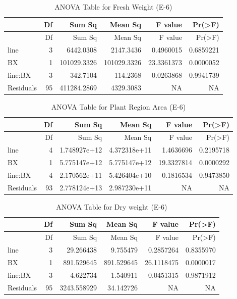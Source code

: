 \documentclass[
  10pt,
]{article}
\begin{document}
\begin{longtable}[]{@{}lrrrrr@{}}
\caption{ANOVA Table for Fresh Weight (E-6)}\tabularnewline
\toprule\noalign{}
& Df & Sum Sq & Mean Sq & F value & Pr(\textgreater F) \\
\midrule\noalign{}
\endfirsthead
\toprule\noalign{}
& Df & Sum Sq & Mean Sq & F value & Pr(\textgreater F) \\
\midrule\noalign{}
\endhead
\bottomrule\noalign{}
\endlastfoot
line & 3 & 6442.0308 & 2147.3436 & 0.4960015 & 0.6859221 \\
BX & 1 & 101029.3326 & 101029.3326 & 23.3361373 & 0.0000052 \\
line:BX & 3 & 342.7104 & 114.2368 & 0.0263868 & 0.9941739 \\
Residuals & 95 & 411284.2869 & 4329.3083 & NA & NA \\
\end{longtable}

\begin{longtable}[]{@{}lrrrrr@{}}
\caption{ANOVA Table for Plant Region Area (E-6)}\tabularnewline
\toprule\noalign{}
& Df & Sum Sq & Mean Sq & F value & Pr(\textgreater F) \\
\midrule\noalign{}
\endfirsthead
\toprule\noalign{}
& Df & Sum Sq & Mean Sq & F value & Pr(\textgreater F) \\
\midrule\noalign{}
\endhead
\bottomrule\noalign{}
\endlastfoot
line & 4 & 1.748927e+12 & 4.372318e+11 & 1.4636696 & 0.2195718 \\
BX & 1 & 5.775147e+12 & 5.775147e+12 & 19.3327814 & 0.0000292 \\
line:BX & 4 & 2.170562e+11 & 5.426404e+10 & 0.1816534 & 0.9473850 \\
Residuals & 93 & 2.778124e+13 & 2.987230e+11 & NA & NA \\
\end{longtable}

\begin{longtable}[]{@{}lrrrrr@{}}
\caption{ANOVA Table for Dry weight (E-6)}\tabularnewline
\toprule\noalign{}
& Df & Sum Sq & Mean Sq & F value & Pr(\textgreater F) \\
\midrule\noalign{}
\endfirsthead
\toprule\noalign{}
& Df & Sum Sq & Mean Sq & F value & Pr(\textgreater F) \\
\midrule\noalign{}
\endhead
\bottomrule\noalign{}
\endlastfoot
line & 3 & 29.266438 & 9.755479 & 0.2857264 & 0.8355970 \\
BX & 1 & 891.529645 & 891.529645 & 26.1118475 & 0.0000017 \\
line:BX & 3 & 4.622734 & 1.540911 & 0.0451315 & 0.9871912 \\
Residuals & 95 & 3243.558929 & 34.142726 & NA & NA \\
\end{longtable}
\end{document}
